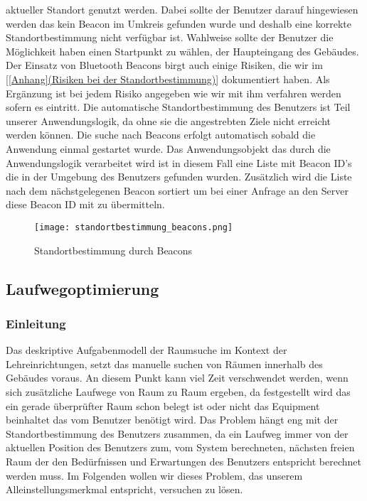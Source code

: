 aktueller Standort genutzt werden. Dabei sollte der Benutzer darauf hingewiesen
werden das kein Beacon im Umkreis gefunden wurde und deshalb eine korrekte
Standortbestimmung nicht verfügbar ist. Wahlweise sollte der Benutzer die
Möglichkeit haben einen Startpunkt zu wählen, \bspw der Haupteingang des
Gebäudes. Der Einsatz von Bluetooth Beacons birgt auch einige Risiken, die wir
im \ref{[Anhang](Risiken bei der Standortbestimmung)} dokumentiert haben.
Als Ergänzung ist bei jedem Risiko angegeben wie wir mit ihm verfahren werden
sofern es eintritt. Die automatische Standortbestimmung des Benutzers ist Teil
unserer Anwendungslogik, da ohne sie die angestrebten Ziele nicht erreicht
werden können. Die suche nach Beacons erfolgt automatisch sobald die Anwendung
einmal gestartet wurde. Das Anwendungsobjekt das durch die Anwendungslogik
verarbeitet wird ist in diesem Fall eine Liste mit Beacon ID's die in der
Umgebung des Benutzers gefunden wurden. Zusätzlich wird die Liste nach dem
nächstgelegenen Beacon sortiert um bei einer Anfrage an den Server diese
Beacon ID mit zu übermitteln.

\begin{figure}
	\centering
	\texttt{[image: standortbestimmung\_beacons.png]}
	\caption{Standortbestimmung durch Beacons}
\end{figure}


\subsection{Laufwegoptimierung}
\label{sec:Laufwegoptimierung}

\subsubsection{Einleitung}
\label{sec:Laufwegoptimierung_Einleitung}

Das deskriptive Aufgabenmodell der Raumsuche im Kontext der Lehreinrichtungen,
setzt das manuelle suchen von Räumen innerhalb des Gebäudes voraus. An diesem
Punkt kann viel Zeit verschwendet werden, wenn sich zusätzliche Laufwege von
Raum zu Raum ergeben, da festgestellt wird das ein gerade überprüfter Raum
schon belegt ist oder nicht das Equipment beinhaltet das vom Benutzer benötigt
wird. Das Problem hängt eng mit der Standortbestimmung des Benutzers zusammen,
da ein Laufweg immer von der aktuellen Position des Benutzers zum, vom System
berechneten, nächsten freien Raum der den Bedürfnissen und Erwartungen des
Benutzers entspricht berechnet werden muss. Im Folgenden wollen wir dieses
Problem, das unserem Alleinstellungsmerkmal entspricht, versuchen zu lösen.

